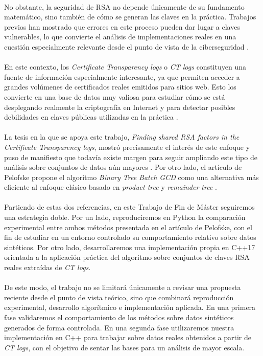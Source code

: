 \\
No obstante, la seguridad de RSA no depende únicamente de su fundamento matemático, sino también de cómo se generan las claves en la práctica. Trabajos previos han mostrado que errores en este proceso pueden dar lugar a claves vulnerables, lo que convierte el análisis de implementaciones reales en una cuestión especialmente relevante desde el punto de vista de la ciberseguridad \cite{heninger2012mining,vage2022finding,pelofske2024efficient}.
\\
\\
En este contexto, los \textit{Certificate Transparency logs} o \textit{CT logs} constituyen una fuente de información especialmente interesante, ya que permiten acceder a grandes volúmenes de certificados reales emitidos para sitios web. Esto los convierte en una base de datos muy valiosa para estudiar cómo se está desplegando realmente la criptografía en Internet y para detectar posibles debilidades en claves públicas utilizadas en la práctica \cite{vage2022finding}.
\\
\\
La tesis en la que se apoya este trabajo, \textit{Finding shared RSA factors in the Certificate Transparency logs}, mostró precisamente el interés de este enfoque y puso de manifiesto que todavía existe margen para seguir ampliando este tipo de análisis sobre conjuntos de datos aún mayores \cite{vage2022finding}. Por otro lado, el artículo de Pelofske propone el algoritmo \textit{Binary Tree Batch GCD} como una alternativa más eficiente al enfoque clásico basado en \textit{product tree} y \textit{remainder tree} \cite{pelofske2024efficient}.
\\
\\
Partiendo de estas dos referencias, en este Trabajo de Fin de Máster seguiremos una estrategia doble. Por un lado, reproduciremos en Python la comparación experimental entre ambos métodos presentada en el artículo de Pelofske, con el fin de estudiar en un entorno controlado su comportamiento relativo sobre datos sintéticos. Por otro lado, desarrollaremos una implementación propia en C++17 orientada a la aplicación práctica del algoritmo sobre conjuntos de claves RSA reales extraídas de \textit{CT logs}.
\\
\\
De este modo, el trabajo no se limitará únicamente a revisar una propuesta reciente desde el punto de vista teórico, sino que combinará reproducción experimental, desarrollo algorítmico e implementación aplicada. En una primera fase validaremos el comportamiento de los métodos sobre datos sintéticos generados de forma controlada. En una segunda fase utilizaremos nuestra implementación en C++ para trabajar sobre datos reales obtenidos a partir de \textit{CT logs}, con el objetivo de sentar las bases para un análisis de mayor escala.
